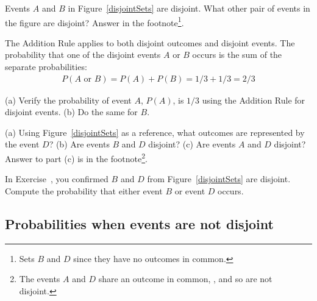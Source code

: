 \begin{exercise}
Events $A$ and $B$ in Figure~\ref{disjointSets} are disjoint. What other pair of events in the figure are disjoint? Answer in the footnote\footnote{Sets $B$ and $D$ since they have no outcomes in common.}.
\end{exercise}

The Addition Rule applies to both disjoint outcomes and disjoint events. The probability that one of the disjoint events $A$ or $B$ occurs is the sum of the separate probabilities:
\begin{eqnarray*}
P(A\text{ or }B) = P(A) + P(B) = 1/3 + 1/3 = 2/3
\end{eqnarray*}

\begin{exercise}
(a) Verify the probability of event $A$, $P(A)$, is $1/3$ using the Addition Rule for disjoint events. (b) Do the same for $B$.
\end{exercise}

\begin{exercise} \label{exerExaminingDisjointSetsABD}
(a) Using Figure~\ref{disjointSets} as a reference, what outcomes are represented by the event $D$? (b) Are events $B$ and $D$ disjoint? (c) Are events $A$ and $D$ disjoint? Answer to part (c) is in the footnote\footnote{The events $A$ and $D$ share an outcome in common, , and so are not disjoint.}.
\end{exercise}

\begin{exercise}
In Exercise~, you confirmed $B$ and $D$ from Figure~\ref{disjointSets} are disjoint. Compute the probability that either event $B$ or event $D$ occurs.
\end{exercise}

\subsection{Probabilities when events are not disjoint}

